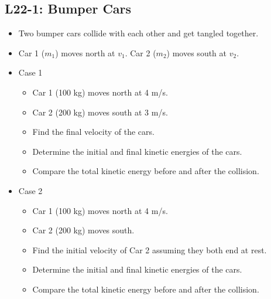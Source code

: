 \documentclass[]{article}
\newcommand{\Week}{22}
\begin{document}
\begin{PresentSpace}
\vspace{-10pt}
\section*{L\Week-1: Bumper Cars}
\vspace{-10pt}
\begin{itemize}
	\item Two bumper cars collide with each other and get tangled together.
	\item Car 1 ($m_{1}$) moves north at $v_{1}$. Car 2 ($m_{2}$) moves south at $v_{2}$.
\end{itemize}
\begin{multicols}{2}
	\begin{itemize}
		\item Case 1
		\begin{itemize}
			\large
			\item Car 1 (100 kg) moves north at 4 m/s.
			\item Car 2 (200 kg) moves south at 3 m/s.
			\item Find the final velocity of the cars.
			\item Determine the initial and final kinetic energies of the cars.
			\item Compare the total kinetic energy before and after the collision.
		\end{itemize}
		\item Case 2
		\begin{itemize}
			\large
			\item Car 1 (100 kg) moves north at 4 m/s.
			\item Car 2 (200 kg) moves south.
			\item Find the initial velocity of Car 2 assuming they both end at rest.
			\item Determine the initial and final kinetic energies of the cars.
			\item Compare the total kinetic energy before and after the collision.
		\end{itemize}
	\end{itemize}
\end{multicols}
\end{PresentSpace}
\newpage
\setcounter{ActNumber}{1}
\begin{TeacherMargin}
\begin{multicols}{2}
\SpringSledSol
\end{multicols}
\end{TeacherMargin}
\end{document}
